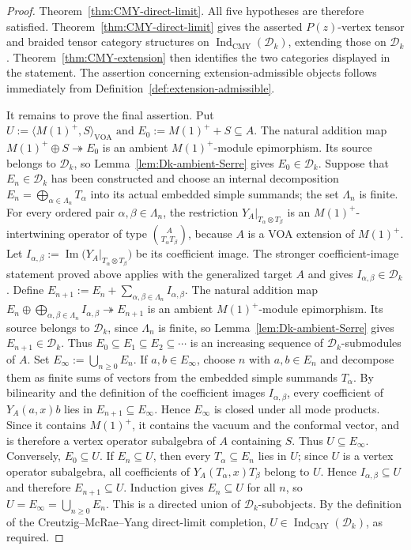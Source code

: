 \documentclass[12pt,leqno]{amsart}
\numberwithin{equation}{section} \newtheorem{thm}{Theorem}[section] \newtheorem{lem}[thm]{Lemma} \newtheorem{ex}[thm]{Example} \newtheorem{prop}[thm]{Proposition} \newtheorem{cor}[thm]{Corollary} \newtheorem{defi}[thm]{Definition} \newtheorem{rmk}[thm]{Remark} \newtheorem{notation}[thm]{Notation}
\newcommand{\Dk}{\mathcal D_k}
\newcommand{\IndCMY}{\operatorname{Ind}_{\mathrm{CMY}}}
\begin{document}
\begin{proof}
Theorem~\ref{thm:CMY-direct-limit}. All five hypotheses are therefore satisfied. Theorem~\ref{thm:CMY-direct-limit} gives the asserted $P(z)$-vertex tensor and braided tensor category structures on $\IndCMY(\Dk)$, extending those on $\Dk$. Theorem~\ref{thm:CMY-extension} then identifies the two categories displayed in the statement. The assertion concerning extension-admissible objects follows immediately from Definition~\ref{def:extension-admissible}.

It remains to prove the final assertion. Put \(U:=\langle M(1)^+,S\rangle_{\mathrm{VOA}}\text{ and }E_0:=M(1)^++S\subseteq A\). The natural addition map \(M(1)^+\oplus S\twoheadrightarrow E_0\) is an ambient $M(1)^+$-module epimorphism. Its source belongs to $\Dk$, so Lemma~\ref{lem:Dk-ambient-Serre} gives $E_0\in\Dk$. Suppose that $E_n\in\Dk$ has been constructed and choose an internal decomposition \(E_n=\bigoplus_{\alpha\in\Lambda_n}T_\alpha\) into its actual embedded simple summands; the set $\Lambda_n$ is finite. For every ordered pair $\alpha,\beta\in\Lambda_n$, the restriction \(Y_A|_{T_\alpha\otimes T_\beta}\) is an $M(1)^+$-intertwining operator of type \(\binom{A}{T_\alpha T_\beta}\), because $A$ is a VOA extension of $M(1)^+$. Let \(I_{\alpha,\beta}:=\operatorname{Im}\bigl(Y_A|_{T_\alpha\otimes T_\beta}\bigr)\) be its coefficient image. The stronger coefficient-image statement proved above applies with the generalized target $A$ and gives $I_{\alpha,\beta}\in\Dk$. Define \(E_{n+1}:=E_n+\sum_{\alpha,\beta\in\Lambda_n}I_{\alpha,\beta}\). The natural addition map \(E_n\oplus\bigoplus_{\alpha,\beta\in\Lambda_n}I_{\alpha,\beta}\twoheadrightarrow E_{n+1}\) is an ambient $M(1)^+$-module epimorphism. Its source belongs to $\Dk$, since $\Lambda_n$ is finite, so Lemma~\ref{lem:Dk-ambient-Serre} gives $E_{n+1}\in\Dk$. Thus \(E_0\subseteq E_1\subseteq E_2\subseteq\cdots\) is an increasing sequence of $\Dk$-submodules of $A$. Set $E_\infty:=\bigcup_{n\ge0}E_n$. If $a,b\in E_\infty$, choose $n$ with $a,b\in E_n$ and decompose them as finite sums of vectors from the embedded simple summands $T_\alpha$. By bilinearity and the definition of the coefficient images $I_{\alpha,\beta}$, every coefficient of $Y_A(a,x)b$ lies in $E_{n+1}\subseteq E_\infty$. Hence $E_\infty$ is closed under all mode products. Since it contains $M(1)^+$, it contains the vacuum and the conformal vector, and is therefore a vertex operator subalgebra of $A$ containing $S$. Thus $U\subseteq E_\infty$. Conversely, $E_0\subseteq U$. If $E_n\subseteq U$, then every $T_\alpha\subseteq E_n$ lies in $U$; since $U$ is a vertex operator subalgebra, all coefficients of $Y_A(T_\alpha,x)T_\beta$ belong to $U$. Hence $I_{\alpha,\beta}\subseteq U$ and therefore $E_{n+1}\subseteq U$. Induction gives $E_n\subseteq U$ for all $n$, so \(U=E_\infty=\bigcup_{n\ge0}E_n\). This is a directed union of $\Dk$-subobjects. By the definition of the Creutzig--McRae--Yang direct-limit completion, $U\in\IndCMY(\Dk)$, as required.
\end{proof}
\end{document}
